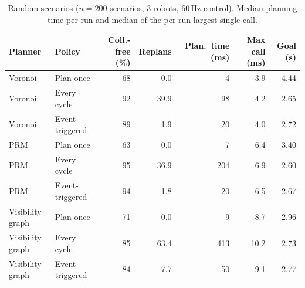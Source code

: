 \begin{table}[t]
\centering
\footnotesize
\caption{Random scenarios ($n=200$ scenarios, 3 robots, 60\,Hz control). Median planning time per run and median of the per-run largest single call.}
\label{tab:random}
\begin{tabular}{llrrrrr}
\hline
Planner & Policy & Coll.-free (\%) & Replans & Plan.\ time (ms) & Max call (ms) & Goal (s) \\
\hline
Voronoi & Plan once & 68 & 0.0 & 4 & 3.9 & 4.44 \\
Voronoi & Every cycle & 92 & 39.9 & 98 & 4.2 & 2.65 \\
Voronoi & Event-triggered & 89 & 1.9 & 20 & 4.0 & 2.72 \\
PRM & Plan once & 63 & 0.0 & 7 & 6.4 & 3.40 \\
PRM & Every cycle & 95 & 36.9 & 204 & 6.9 & 2.60 \\
PRM & Event-triggered & 94 & 1.8 & 20 & 6.5 & 2.67 \\
Visibility graph & Plan once & 71 & 0.0 & 9 & 8.7 & 2.96 \\
Visibility graph & Every cycle & 85 & 63.4 & 413 & 10.2 & 2.73 \\
Visibility graph & Event-triggered & 84 & 7.7 & 50 & 9.1 & 2.77 \\
\hline
\end{tabular}
\end{table}
